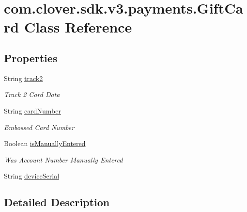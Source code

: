 \hypertarget{classcom_1_1clover_1_1sdk_1_1v3_1_1payments_1_1_gift_card}{}\section{com.\+clover.\+sdk.\+v3.\+payments.\+Gift\+Card Class Reference}
\label{classcom_1_1clover_1_1sdk_1_1v3_1_1payments_1_1_gift_card}
\subsection*{Properties}
\begin{DoxyCompactItemize}
\item 
String \hyperlink{classcom_1_1clover_1_1sdk_1_1v3_1_1payments_1_1_gift_card_a1820ebe9fb6e663ec797bc05595bb799}{track2}
\begin{DoxyCompactList}\small\item\em Track 2 Card Data \end{DoxyCompactList}\item 
String \hyperlink{classcom_1_1clover_1_1sdk_1_1v3_1_1payments_1_1_gift_card_a3a8d12c8c11e7757ca2c9e67ca5ff3f0}{card\+Number}
\begin{DoxyCompactList}\small\item\em Embossed Card Number \end{DoxyCompactList}\item 
Boolean \hyperlink{classcom_1_1clover_1_1sdk_1_1v3_1_1payments_1_1_gift_card_a384d53479b91d5f99819e377d853c97a}{is\+Manually\+Entered}
\begin{DoxyCompactList}\small\item\em Was Account Number Manually Entered \end{DoxyCompactList}\item 
String \hyperlink{classcom_1_1clover_1_1sdk_1_1v3_1_1payments_1_1_gift_card_aa2564f5d2f6b5a8604aafdb85aaf8c8d}{device\+Serial}
\end{DoxyCompactItemize}


\subsection{Detailed Description}


